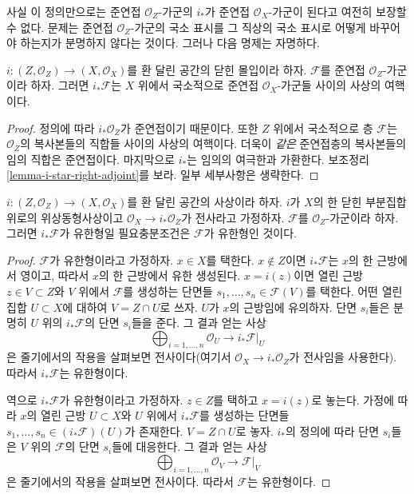 \noindent
사실 이 정의만으로는 준연접 $\mathcal{O}_Z$-가군의 $i_*$가
준연접 $\mathcal{O}_X$-가군이 된다고 여전히 보장할 수 없다.
문제는 준연접 $\mathcal{O}_Z$-가군의 국소 표시를 그 직상의
국소 표시로 어떻게 바꾸어야 하는지가 분명하지 않다는 것이다.
그러나 다음 명제는 자명하다.

\begin{lemma}
\label{lemma-i-star-quasi-coherent}
$i : (Z, \mathcal{O}_Z) \to (X, \mathcal{O}_X)$를
환 달린 공간의 닫힌 몰입이라 하자.
$\mathcal{F}$를 준연접 $\mathcal{O}_Z$-가군이라 하자.
그러면 $i_*\mathcal{F}$는 $X$ 위에서 국소적으로 준연접
$\mathcal{O}_X$-가군들 사이의 사상의 여핵이다.
\end{lemma}

\begin{proof}
정의에 따라 $i_*\mathcal{O}_Z$가 준연접이기 때문이다.
또한 $Z$ 위에서 국소적으로 층 $\mathcal{F}$는 $\mathcal{O}_Z$의
복사본들의 직합들 사이의 사상의 여핵이다. 더욱이 {\it 같은}
준연접층의 복사본들의 임의 직합은 준연접이다. 마지막으로
$i_*$는 임의의 여극한과 가환한다. 보조정리
\ref{lemma-i-star-right-adjoint}를 보라. 일부 세부사항은 생략한다.
\end{proof}

\begin{lemma}
\label{lemma-i-star-reflects-finite-type}
$i : (Z, \mathcal{O}_Z) \to (X, \mathcal{O}_X)$를 환 달린 공간의
사상이라 하자. $i$가 $X$의 한 닫힌 부분집합 위로의 위상동형사상이고
$\mathcal{O}_X \to i_*\mathcal{O}_Z$가 전사라고 가정하자.
$\mathcal{F}$를 $\mathcal{O}_Z$-가군이라 하자. 그러면
$i_*\mathcal{F}$가 유한형일 필요충분조건은 $\mathcal{F}$가 유한형인 것이다.
\end{lemma}

\begin{proof}
$\mathcal{F}$가 유한형이라고 가정하자. $x \in X$를 택한다.
$x \not \in Z$이면 $i_*\mathcal{F}$는 $x$의 한 근방에서 영이고,
따라서 $x$의 한 근방에서 유한 생성된다. $x = i(z)$이면 열린 근방
$z \in V \subset Z$와 $V$ 위에서 $\mathcal{F}$를 생성하는 단면들
$s_1, \ldots, s_n \in \mathcal{F}(V)$를 택한다. 어떤 열린집합
$U \subset X$에 대하여 $V = Z \cap U$로 쓰자. $U$가 $x$의 근방임에
유의하자. 단면 $s_i$들은 분명히 $U$ 위의 $i_*\mathcal{F}$의 단면
$s_i$들을 준다. 그 결과 얻는 사상
$$
\bigoplus\nolimits_{i = 1, \ldots, n} \mathcal{O}_U
\longrightarrow
i_*\mathcal{F}|_U
$$
은 줄기에서의 작용을 살펴보면 전사이다(여기서
$\mathcal{O}_X \to i_*\mathcal{O}_Z$가 전사임을 사용한다).
따라서 $i_*\mathcal{F}$는 유한형이다.

\medskip\noindent
역으로 $i_*\mathcal{F}$가 유한형이라고 가정하자. $z \in Z$를 택하고
$x = i(z)$로 놓는다. 가정에 따라 $x$의 열린 근방 $U \subset X$와
$U$ 위에서 $i_*\mathcal{F}$를 생성하는 단면들
$s_1, \ldots, s_n \in (i_*\mathcal{F})(U)$가 존재한다.
$V = Z \cap U$로 놓자. $i_*$의 정의에 따라 단면 $s_i$들은
$V$ 위의 $\mathcal{F}$의 단면 $s_i$들에 대응한다. 그 결과 얻는 사상
$$
\bigoplus\nolimits_{i = 1, \ldots, n} \mathcal{O}_V
\longrightarrow
\mathcal{F}|_V
$$
은 줄기에서의 작용을 살펴보면 전사이다. 따라서 $\mathcal{F}$는 유한형이다.
\end{proof}

